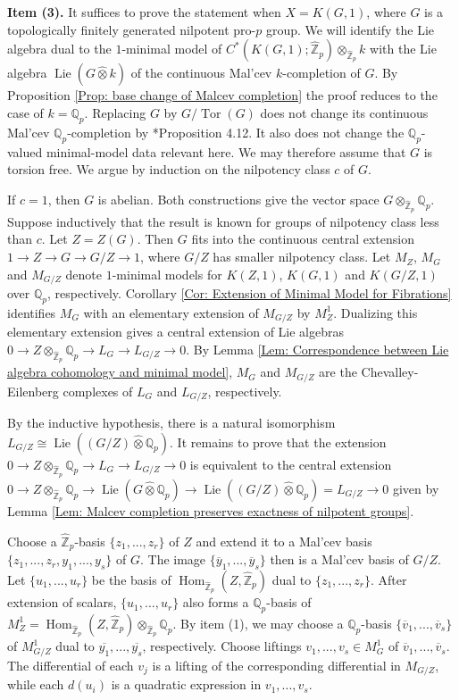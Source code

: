\documentclass[11pt]{amsart}
\theoremstyle{definition}
\numberwithin{equation}{section}
\numberwithin{equation}{section}
\newcommand\QQ{\mathbb{Q}}
\newcommand\ZZ{\mathbb{Z}}
\DeclareMathOperator{\homo}{Hom}
\DeclareMathOperator{\Tor}{Tor}
\DeclareMathOperator{\Lie}{Lie}
\begin{document}
\textbf{Item (3).} It suffices to prove the statement when $X=K(G,1)$, where $G$ is a topologically finitely generated nilpotent pro-$p$ group. We will identify
the Lie algebra dual to the $1$-minimal model of $C^*(K(G,1);\widehat{\ZZ}_p)\otimes_{\widehat{\ZZ}_p}k$ with the Lie algebra $\Lie(G\widehat{\otimes}k)$ of the continuous Mal'cev $k$-completion of $G$. By Proposition \ref{Prop: base change of Malcev completion} the proof reduces to the case of $k=\QQ_p$. Replacing $G$ by $G/\Tor(G)$ does not change its continuous Mal'cev $\QQ_p$-completion by \cite{Hu-Wang-continuou-Malcev-completion}*{Proposition 4.12}. It also does not change the $\QQ_p$-valued minimal-model data relevant here. We may therefore assume that $G$ is torsion free. We argue by induction on the nilpotency class $c$ of $G$.

If $c=1$, then $G$ is abelian. Both constructions give the vector space $G\otimes_{\widehat{\ZZ}_p}\QQ_p$. Suppose inductively that the result is known for groups of nilpotency class less than $c$. Let $Z=Z(G)$. Then $G$ fits into the continuous central extension $1\rightarrow Z\rightarrow G\rightarrow G/Z\rightarrow 1$, where $G/Z$ has smaller nilpotency class. Let $M_Z$, $M_G$ and $M_{G/Z}$ denote $1$-minimal models for $K(Z,1)$, $K(G,1)$ and $K(G/Z,1)$ over $\QQ_p$, respectively. 
Corollary \ref{Cor: Extension of Minimal Model for Fibrations} identifies $M_G$ with an elementary extension of $M_{G/Z}$ by $M^1_Z$.
Dualizing this elementary extension gives a central extension of Lie algebras $0\rightarrow Z\otimes_{\widehat{\ZZ}_p}\QQ_p\rightarrow L_G\rightarrow L_{G/Z}\rightarrow 0$. By Lemma \ref{Lem: Correspondence between Lie algebra cohomology and minimal model}, $M_G$ and $M_{G/Z}$ are the Chevalley-Eilenberg complexes of $L_G$ and $L_{G/Z}$, respectively. 

By the inductive hypothesis, there is a natural isomorphism $L_{G/Z}\cong\Lie((G/Z)\widehat{\otimes}\QQ_p)$. 
It remains to prove that the extension $0\rightarrow Z\otimes_{\widehat{\ZZ}_p}\QQ_p\rightarrow L_G\rightarrow L_{G/Z}\rightarrow 0$ is equivalent to the central extension $0\rightarrow Z\otimes_{\widehat{\ZZ}_p}\QQ_p\rightarrow \Lie(G\widehat{\otimes}\QQ_p)\rightarrow\Lie((G/Z)\widehat{\otimes}\QQ_p)=L_{G/Z}\rightarrow 0$ given by Lemma \ref{Lem: Malcev completion preserves exactness of nilpotent groups}.

Choose a $\widehat{\ZZ}_p$-basis $\{z_1,...,z_r\}$ of $Z$ and extend it to a Mal'cev basis $\{z_1,...,z_r,y_1,...,y_s\}$ of $G$. The image $\{\overline{y}_1,...,\overline{y}_s\}$ then is a Mal'cev basis of $G/Z$. Let $\{u_1,...,u_r\}$ be the basis  of $ \homo_{\widehat{\ZZ}_p}(Z,\widehat{\ZZ}_p)$ dual to $\{z_1,...,z_r\}$. After extension of scalars, $\{u_1,...,u_r\}$ also forms a $\QQ_p$-basis of $M^1_Z= \homo_{\widehat{\ZZ}_p}(Z,\widehat{\ZZ}_p)\otimes_{\widehat{\ZZ}_p}\QQ_p$. By item (1), we may choose a $\QQ_p$-basis $\{\overline{v}_1,...,\overline{v}_s\}$ of $M^1_{G/Z}$ dual to $\overline{y_1},...,\overline{y_s}$, respectively. Choose liftings $v_1,...,v_s\in M_G^1$ of $\overline{v}_1,...,\overline{v}_s$. The differential of each $v_j$ is a lifting of the corresponding differential in $M_{G/Z}$, while each $d(u_i)$ is a quadratic expression in $v_1,...,v_s$.
\end{document}
